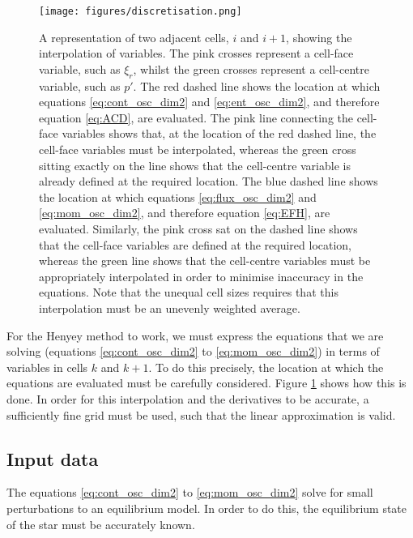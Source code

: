 \documentclass[11pt]{amsart}
\begin{document}
\begin{figure}
\begin{center}
\texttt{[image: figures/discretisation.png]}
\caption{A representation of two adjacent cells, $i$ and $i+1$, showing the interpolation of variables.  The pink crosses represent a cell-face variable, such as $\xi_{r}$, whilst the green crosses represent a cell-centre variable, such as $p'$.  The red dashed line shows the location at which equations \ref{eq:cont_osc_dim2} and \ref{eq:ent_osc_dim2}, and therefore equation \ref{eq:ACD}, are evaluated.  The pink line connecting the cell-face variables shows that, at the location of the red dashed line, the cell-face variables must be interpolated, whereas the green cross sitting exactly on the line shows that the cell-centre variable is already defined at the required location.  The blue dashed line shows the location at which equations \ref{eq:flux_osc_dim2} and \ref{eq:mom_osc_dim2}, and therefore equation \ref{eq:EFH}, are evaluated.  Similarly, the pink cross sat on the dashed line shows that the cell-face variables are defined at the required location, whereas the green line shows that the cell-centre variables must be appropriately interpolated in order to minimise inaccuracy in the equations.  Note that the unequal cell sizes requires that this interpolation must be an unevenly weighted average.}
\label{fig:discretisation}
\end{center}
\end{figure}


For the Henyey method to work, we must express the equations that we are solving (equations \ref{eq:cont_osc_dim2} to \ref{eq:mom_osc_dim2}) in terms of variables in cells $k$ and $k+1$.  To do this precisely, the location at which the equations are evaluated must be carefully considered.  Figure \ref{fig:discretisation} shows how this is done.  In order for this interpolation and the derivatives to be accurate, a sufficiently fine grid must be used, such that the linear approximation is valid.







\subsection{Input data}   \label{Implement:Input}

The equations \ref{eq:cont_osc_dim2} to \ref{eq:mom_osc_dim2} solve for small perturbations to an equilibrium model.  In order to do this, the equilibrium state of the star must be accurately known.  
\end{document}
